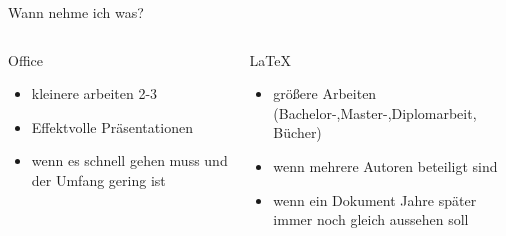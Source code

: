 \begin{frame}{Wann nehme ich was?}
	\begin{columns}
	\centering
		\begin{column}{0.45\textwidth}
			Office
			\begin{itemize}[<+->]
			\item kleinere arbeiten 2-3
			\item Effektvolle Präsentationen
			\item wenn es schnell gehen muss und der Umfang gering ist
			\end{itemize}
		\end{column}
		\begin{column}{0.45\textwidth}
			\LaTeX
			\begin{itemize}[<+->]
			\item größere Arbeiten (Bachelor-,Master-,Diplomarbeit, Bücher)
			\item wenn mehrere Autoren beteiligt sind
			\item wenn ein Dokument Jahre später immer noch gleich aussehen soll
			\end{itemize}
		\end{column}
	\end{columns}
\end{frame}

